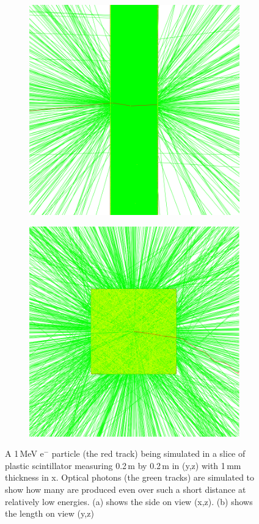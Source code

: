 \begin{figure}[!h]
\centering
\begin{subfigure}{.5\textwidth}
  \centering
  \includegraphics[width=0.7\linewidth]{Chapter4/Figs/Raster/lengthOnViewSliceElectron780Square.png}
  \captionsetup{width=.9\linewidth}
  \caption{}
  \label{subFig:lengthOnViewSliceElectron780Square}
\end{subfigure}%
\begin{subfigure}{.5\textwidth}
  \centering
  \includegraphics[width=0.7\linewidth]{Chapter4/Figs/Raster/sideOnViewSliceElectron780Square.png}
  \captionsetup{width=.9\linewidth}
  \caption{}
  \label{subFig:sideOnViewSliceElectron780Square}
\end{subfigure}
\caption{A 1\,MeV e$^-$ particle (the red track) being simulated in a slice of plastic scintillator measuring 0.2\,m by 0.2\,m in (y,z) with 1\,mm thickness in x. Optical photons (the green tracks) are simulated to show how many are produced even over such a short distance at relatively low energies. (a) shows the side on view (x,z). (b) shows the length on view (y,z)}
\label{fig:lengthAndSideViewSliceElectron780Square}
\end{figure}

